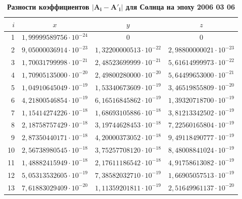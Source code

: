 \begin{table}[b!]
\centering
\small \centering
\caption{\bf Разности коэффициентов $\boldsymbol{|A_i-A'_i|}$ для Солнца на эпоху 2006 03 06}\vspace{-3mm}
\begin{tabular}{r|c|c|c}
\hline	
\footnotesize $i$ & \footnotesize 	$x$	&\footnotesize 	$y$	&\footnotesize 	$z$	\\
\hline
\rule{0mm}{12pt}%
1	&$	1,99999589756\cdot 10^{-24}	$&$	0	$&$	0	$\\
2	&$	9,05000036914\cdot 10^{-23}	$&$	1,32200000513\cdot 10^{-22}	$&$	2,98800000021\cdot 10^{-23}	 $\\
3	&$	1,70031799998\cdot 10^{-21}	$&$	2,48523699999\cdot 10^{-21}	$&$	5,61614999973\cdot 10^{-22}	 $\\
4	&$	1,70905135000\cdot 10^{-20}	$&$	2,49800280000\cdot 10^{-20}	$&$	5,64499653000\cdot 10^{-21}	 $\\
5	&$	1,04910645049\cdot 10^{-19}	$&$	1,53340673609\cdot 10^{-19}	$&$	3,46519855809\cdot 10^{-20}	 $\\
6	&$	4,21800546854\cdot 10^{-19}	$&$	6,16516845862\cdot 10^{-19}	$&$	1,39320718700\cdot 10^{-19}	 $\\
7	&$	1,15414274226\cdot 10^{-18}	$&$	1,68693105886\cdot 10^{-18}	$&$	3,81213342502\cdot 10^{-19}	 $\\
8	&$	2,18758757429\cdot 10^{-18}	$&$	3,19744628453\cdot 10^{-18}	$&$	7,22560165804\cdot 10^{-19}	 $\\
9	&$	2,87350440171\cdot 10^{-18}	$&$	4,20000373052\cdot 10^{-18}	$&$	9,49118490777\cdot 10^{-19}	 $\\
10	&$	2,56738980545\cdot 10^{-18}	$&$	3,75257708120\cdot 10^{-18}	$&$	8,48008841024\cdot 10^{-19}	$\\
11	&$	1,48882415949\cdot 10^{-18}	$&$	2,17611186542\cdot 10^{-18}	$&$	4,91758613082\cdot 10^{-19}	$\\
12	&$	5,05313532605\cdot 10^{-19}	$&$	7,38582032710\cdot 10^{-19}	$&$	1,66905057513\cdot 10^{-19}	$\\
13	&$	7,61883029409\cdot 10^{-20}	$&$	1,11359201811\cdot 10^{-19}	$&$	2,51649961137\cdot 10^{-20}	$\\
\hline
\end{tabular}
\vspace{-3mm}
\end{table}

